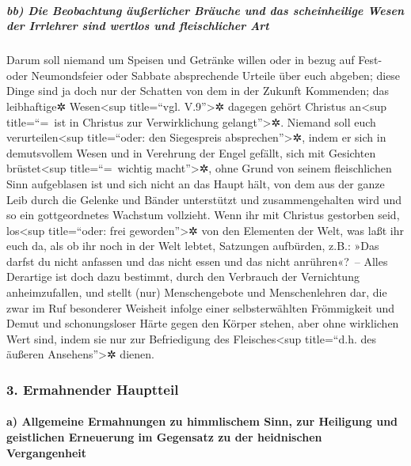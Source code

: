 \hypertarget{bb-die-beobachtung-uxe4uuxdferlicher-bruxe4uche-und-das-scheinheilige-wesen-der-irrlehrer-sind-wertlos-und-fleischlicher-art}{%
\subparagraph{bb) Die Beobachtung äußerlicher Bräuche und das
scheinheilige Wesen der Irrlehrer sind wertlos und fleischlicher
Art}\label{bb-die-beobachtung-uxe4uuxdferlicher-bruxe4uche-und-das-scheinheilige-wesen-der-irrlehrer-sind-wertlos-und-fleischlicher-art}}

 Darum soll niemand um Speisen und Getränke willen oder
in bezug auf Fest- oder Neumondsfeier oder Sabbate absprechende Urteile
über euch abgeben;  diese Dinge sind ja doch nur der
Schatten von dem in der Zukunft Kommenden; das leibhaftige✲
Wesen\textless sup title=``vgl. V.9''\textgreater✲ dagegen gehört
Christus an\textless sup title=``=~ist in Christus zur Verwirklichung
gelangt''\textgreater✲.  Niemand soll euch
verurteilen\textless sup title=``oder: den Siegespreis
absprechen''\textgreater✲, indem er sich in demutsvollem Wesen und in
Verehrung der Engel gefällt, sich mit Gesichten brüstet\textless sup
title=``=~wichtig macht''\textgreater✲, ohne Grund von seinem
fleischlichen Sinn aufgeblasen ist  und sich nicht an das
Haupt hält, von dem aus der ganze Leib durch die Gelenke und Bänder
unterstützt und zusammengehalten wird und so ein gottgeordnetes Wachstum
vollzieht.  Wenn ihr mit Christus gestorben seid,
los\textless sup title=``oder: frei geworden''\textgreater✲ von den
Elementen der Welt, was laßt ihr euch da, als ob ihr noch in der Welt
lebtet, Satzungen aufbürden,  z.B.: »Das darfst du nicht
anfassen und das nicht essen und das nicht anrühren«?~-- 
Alles Derartige ist doch dazu bestimmt, durch den Verbrauch der
Vernichtung anheimzufallen, und stellt (nur) Menschengebote und
Menschenlehren dar,  die zwar im Ruf besonderer Weisheit
infolge einer selbsterwählten Frömmigkeit und Demut und schonungsloser
Härte gegen den Körper stehen, aber ohne wirklichen Wert sind, indem sie
nur zur Befriedigung des Fleisches\textless sup title=``d.h. des äußeren
Ansehens''\textgreater✲ dienen.

\hypertarget{ermahnender-hauptteil}{%
\subsubsection{3. Ermahnender Hauptteil}\label{ermahnender-hauptteil}}

\hypertarget{a-allgemeine-ermahnungen-zu-himmlischem-sinn-zur-heiligung-und-geistlichen-erneuerung-im-gegensatz-zu-der-heidnischen-vergangenheit}{%
\paragraph{a) Allgemeine Ermahnungen zu himmlischem Sinn, zur Heiligung
und geistlichen Erneuerung im Gegensatz zu der heidnischen
Vergangenheit}\label{a-allgemeine-ermahnungen-zu-himmlischem-sinn-zur-heiligung-und-geistlichen-erneuerung-im-gegensatz-zu-der-heidnischen-vergangenheit}}

